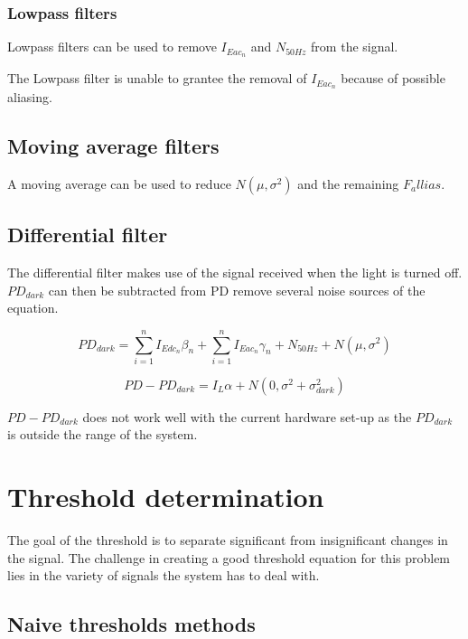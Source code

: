 \subsubsection{Lowpass filters}
Lowpass filters can be used to remove $I_{Eac{_n}}$ and $N_{50Hz}$ from the signal.

The Lowpass filter is unable to grantee the removal of $I_{Eac{_n}}$ because of possible aliasing.

\subsection{Moving average filters}
A moving average can be used to reduce $N(\mu,\sigma^2)$ and the remaining $F_allias$.



\subsection{Differential filter}
The differential filter makes use of the signal received when the light is turned off. $PD_{dark}$ can then be subtracted from PD remove several noise sources of the equation.

\begin{equation}
\label{eq:Pd_dark}
PD_{dark} = \sum_{i=1}^n I_{Edc_{n}} \beta_{n} + \sum_{i=1}^n I_{Eac{_n}} \gamma_{n} + N_{50Hz} + N(\mu,\sigma^2)
\end{equation}

\begin{equation}
\label{eq:Pd_light_dark}
PD - PD_{dark} = I_{L} \alpha + N(0,\sigma^2 + \sigma^2_{dark})
\end{equation}

$PD - PD_{dark}$ does not work well with the current hardware set-up as the $PD_{dark}$ is outside the range of the system.

\section{Threshold determination}
The goal of the threshold is to separate significant from insignificant changes in the signal. The challenge in creating a good threshold equation for this problem lies in the variety of signals the system has to deal with. 

\subsection{Naive thresholds methods}

